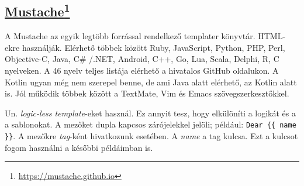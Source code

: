 \subsection[Mustache]{\href{https://mustache.github.io}{Mustache}\footnote{\url{https://mustache.github.io}}}
A Mustache az egyik legtöbb forrással rendelkező templater könyvtár.
HTML-ekre használják. 
Elérhető többek között Ruby, JavaScript, Python, PHP, Perl, Objective-C, Java, C\# /.NET, Android, C++, Go, Lua, Scala, Delphi, R, C nyelveken.
A 46 nyelv teljes listája elérhető a hivatalos GitHub oldalukon.
A Kotlin ugyan még nem szerepel benne, de ami Java alatt elérhető, az Kotlin alatt is.
Jól működik többek között a TextMate, Vim és Emacs szövegszerkesztőkkel.

Un. \textit{logic-less template}-eket használ.
Ez annyit tesz, hogy elkülöníti a logikát és a a sablonokat.
A mezőket dupla kapcsos zárójelekkel jelöli; például: \texttt{Dear \{\{ name \}\}}.
A mezőkre \textit{tag}-ként hivatkozunk esetében.
A \textit{name} a tag kulcsa.
Ezt a kulcsot fogom használni a későbbi példáimban is.


